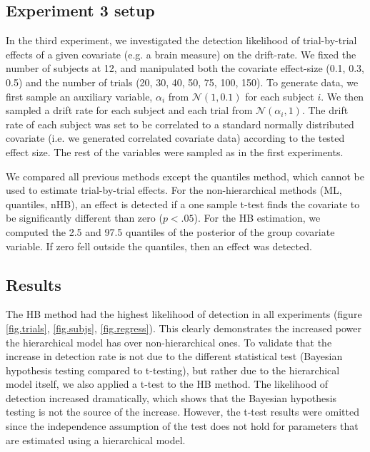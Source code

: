 \documentclass[letterpaper,10pt,english]{article}
\begin{document}
\subsection*{Experiment 3 setup}
In the third experiment, we investigated the detection likelihood of
trial-by-trial effects of a given covariate (e.g. a brain measure) on
the drift-rate. We fixed the number of subjects at 12, and manipulated
both the covariate effect-size (0.1, 0.3, 0.5) and the number of
trials (20, 30, 40, 50, 75, 100, 150). To generate data, we first
sample an auxiliary variable, $\alpha_i$ from $\mathcal{N}(1, 0.1)$
for each subject $i$. We then sampled a drift rate for each subject
and each trial from $\mathcal{N}(\alpha_i, 1)$. The drift rate of each
subject was set to be correlated to a standard normally distributed
covariate (i.e. we generated correlated covariate data) according to
the tested effect size. The rest of the variables were sampled as in
the first experiments.

We compared all previous methods except the quantiles method, which
cannot be used to estimate trial-by-trial effects. For the
non-hierarchical methods (ML, quantiles, nHB), an effect is detected
if a one sample t-test finds the covariate to be significantly
different than zero ($p < .05$). For the HB estimation, we computed
the 2.5 and 97.5 quantiles of the posterior of the group covariate
variable. If zero fell outside the quantiles, then an effect was
detected.


\subsection*{Results}
The HB method had the highest likelihood of detection in all
experiments (figure \ref{fig.trials}, \ref{fig.subjs},
\ref{fig.regress}). This clearly demonstrates the increased power the
hierarchical model has over non-hierarchical ones. To validate that
the increase in detection rate is not due to the different statistical
test (Bayesian hypothesis testing compared to t-testing), but rather
due to the hierarchical model itself, we also applied a t-test to the
HB method. The likelihood of detection increased dramatically, which
shows that the Bayesian hypothesis testing is not the source of the
increase. However, the t-test results were omitted since the
independence assumption of the test does not hold for parameters that
are estimated using a hierarchical model.
\end{document}
